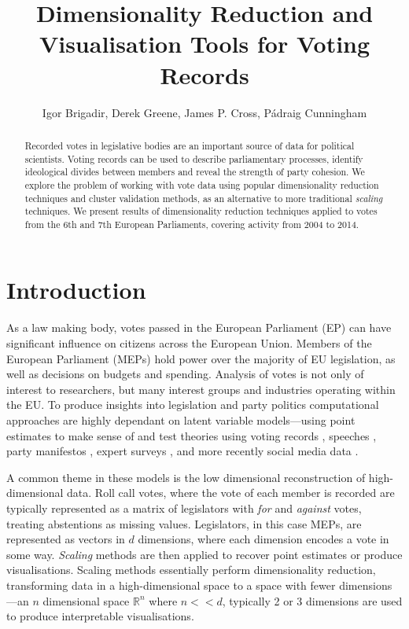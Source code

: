 \documentclass{llncs}
\title{Dimensionality Reduction and Visualisation Tools for Voting Records}
\author{Igor Brigadir\inst{1}, Derek Greene\inst{1}, James P. Cross\inst{2}, P\'{a}draig Cunningham\inst{1}}
\institute{Insight Centre for Data Analytics, University College Dublin, Ireland \\
\email{\{igor.brigadir,derek.greene,padraig.cunningham\}@insight-centre.org} 
\and
School of Politics \& International Relations, University College Dublin, Ireland \\
\email{james.cross@ucd.ie} 
}
\begin{document}
\maketitle

\begin{abstract}
Recorded votes in legislative bodies are an important source of data for political scientists. Voting records can be used to describe parliamentary processes, identify ideological divides between members and reveal the strength of party cohesion. We explore the problem of working with vote data using popular dimensionality reduction techniques and cluster validation methods, as an alternative to more traditional \emph{scaling} techniques. We present results of dimensionality reduction techniques applied to votes from the 6th and 7th European Parliaments, covering activity from 2004 to 2014.
\end{abstract}

\section{Introduction}
As a law making body, votes passed in the European Parliament (EP) can have significant influence on citizens across the European Union. Members of the European Parliament (MEPs) hold power over the majority of EU legislation, as well as decisions on budgets and spending. Analysis of votes is not only of interest to researchers, but many interest groups and industries operating within the EU. To produce insights into legislation and party politics computational approaches are highly dependant on latent variable models---using point estimates to make sense of and test theories using voting records \cite{hix2006dim}, speeches \cite{proksch2010position}, party manifestos \cite{manifesto}, expert surveys \cite{mcelroy2012policy}, and more recently social media data \cite{Barbera2014}.

A common theme in these models is the low dimensional reconstruction of high-dimensional data. Roll call votes, where the vote of each member is recorded are typically represented as a matrix of legislators with \emph{for} and \emph{against} votes, treating abstentions as missing values. Legislators, in this case MEPs, are represented as vectors in $d$ dimensions, where each dimension encodes a vote in some way. \emph{Scaling} methods are then applied to recover point estimates or produce visualisations. Scaling methods essentially perform dimensionality reduction, transforming data in a high-dimensional space to a space with fewer dimensions---an $n$ dimensional space $\mathbb{R}^n$ where $n << d$, typically 2 or 3 dimensions are used to produce interpretable visualisations.
\end{document}
